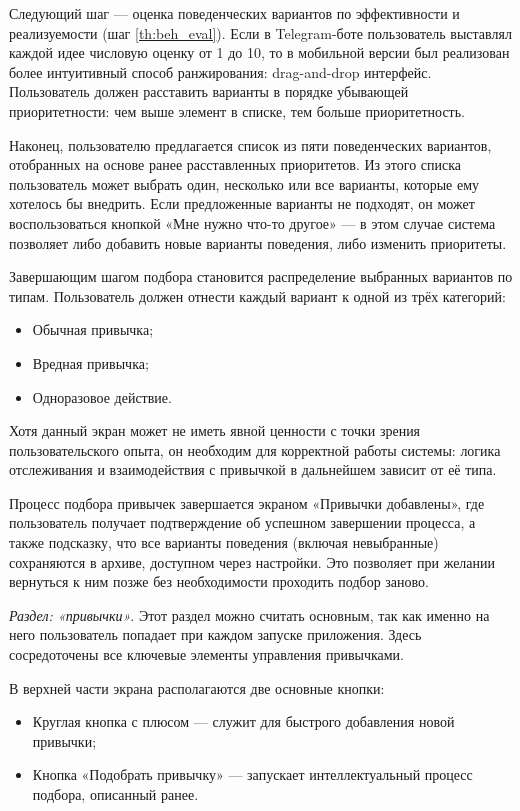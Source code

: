 \documentclass[pdflatex,sn-mathphys-num]{sn-jnl}%
\theoremstyle{thmstyleone}%
\theoremstyle{thmstyletwo}%
\theoremstyle{thmstylethree}%
\begin{document}
Следующий шаг — оценка поведенческих вариантов по эффективности и реализуемости (шаг \ref{th:beh_eval}). Если в Telegram-боте пользователь выставлял каждой идее числовую оценку от 1 до 10, то в мобильной версии был реализован более интуитивный способ ранжирования: drag-and-drop интерфейс. Пользователь должен расставить варианты в порядке убывающей приоритетности: чем выше элемент в списке, тем больше приоритетность.

Наконец, пользователю предлагается список из пяти поведенческих вариантов, отобранных на основе ранее расставленных приоритетов. Из этого списка пользователь может выбрать один, несколько или все варианты, которые ему хотелось бы внедрить. Если предложенные варианты не подходят, он может воспользоваться кнопкой «Мне нужно что-то другое» — в этом случае система позволяет либо добавить новые варианты поведения, либо изменить приоритеты.

Завершающим шагом подбора становится распределение выбранных вариантов по типам. Пользователь должен отнести каждый вариант к одной из трёх категорий:

\begin{itemize}
    \item Обычная привычка;
    \item Вредная привычка;
    \item Одноразовое действие.
\end{itemize}

Хотя данный экран может не иметь явной ценности с точки зрения пользовательского опыта, он необходим для корректной работы системы: логика отслеживания и взаимодействия с привычкой в дальнейшем зависит от её типа.

Процесс подбора привычек завершается экраном «Привычки добавлены», где пользователь получает подтверждение об успешном завершении процесса, а также подсказку, что все варианты поведения (включая невыбранные) сохраняются в архиве, доступном через настройки. Это позволяет при желании вернуться к ним позже без необходимости проходить подбор заново.

\textit{Раздел: «привычки»}. Этот раздел можно считать основным, так как именно на него пользователь попадает при каждом запуске приложения. Здесь сосредоточены все ключевые элементы управления привычками.

В верхней части экрана располагаются две основные кнопки:

\begin{itemize}
    \item Круглая кнопка с плюсом — служит для быстрого добавления новой привычки;
    \item Кнопка «Подобрать привычку» — запускает интеллектуальный процесс подбора, описанный ранее.
\end{itemize}
\end{document}
